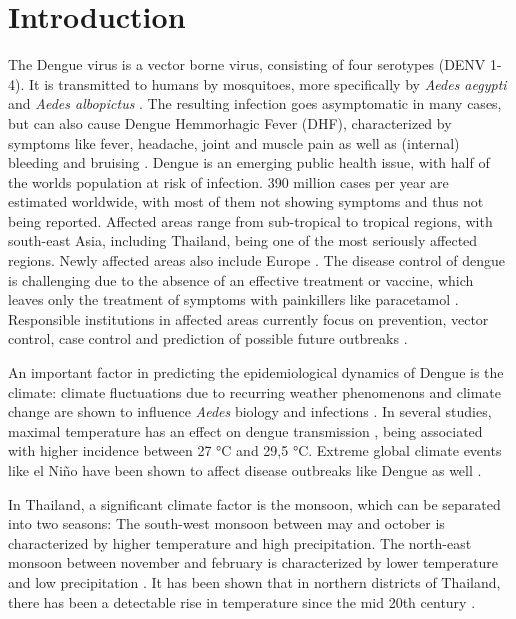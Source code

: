 \section{Introduction}\label{sec:introduction}

The Dengue virus is a vector borne virus, consisting of four serotypes (DENV 1-4).  It is transmitted to humans by mosquitoes, more specifically by \emph{Aedes aegypti} and \emph{Aedes albopictus} \citep{Phanitchat.2019}. The resulting infection goes asymptomatic in many cases, but can also cause Dengue Hemmorhagic Fever (DHF), characterized by symptoms like fever, headache, joint and muscle pain as well as (internal) bleeding and bruising \citep{Gubler.1998}.
Dengue is an emerging public health issue, with half of the worlds population at risk of infection. 390 million cases per year are estimated worldwide, with most of them not showing symptoms and thus not being reported. Affected areas range from sub-tropical to tropical regions, with south-east Asia, including Thailand, being one of the most seriously affected regions. Newly affected areas also include Europe \citep{WHO.2023}.
The disease control of dengue is challenging due to the absence of an effective treatment or vaccine, which leaves only the treatment of symptoms with painkillers like paracetamol \citep{WHO.2023}. Responsible institutions in affected areas currently focus on prevention, vector control, case control and prediction of possible future outbreaks \citep{Phanitchat.2019}. 

An important factor in predicting the epidemiological dynamics of Dengue is the climate: climate fluctuations due to recurring weather phenomenons and climate change are shown to influence \emph{Aedes} biology and infections \citep{Descloux2012, Phanitchat.2019}.
In several studies, maximal temperature has an effect on dengue transmission \citep{Descloux2012}, being associated with higher incidence \citep{Phanitchat.2019} between 27 °C and 29,5 °C. Extreme global climate events like el Niño have been shown to affect disease outbreaks like Dengue as well \citep{Anyamba2019}.

In Thailand, a significant climate factor is the monsoon, which can be separated into two seasons: The south-west monsoon between may and october is characterized by higher temperature and high precipitation. The north-east monsoon between november and february is characterized by lower temperature and low precipitation \citep{Kripalani1995}. It has been shown that in northern districts of Thailand, there has been a detectable rise in temperature since the mid 20th century \citep{Masud2016}.


